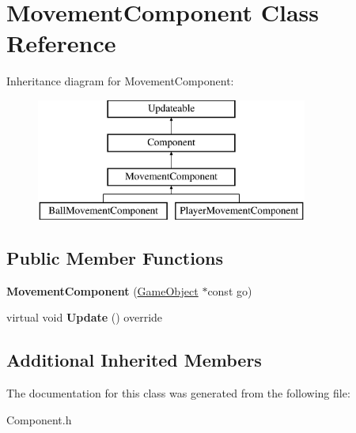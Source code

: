 \hypertarget{class_movement_component}{}\section{Movement\+Component Class Reference}
\label{class_movement_component}
Inheritance diagram for Movement\+Component\+:\begin{figure}[H]
\begin{center}
\leavevmode
\includegraphics[height=4.000000cm]{class_movement_component}
\end{center}
\end{figure}
\subsection*{Public Member Functions}
\begin{DoxyCompactItemize}
\item 
\hypertarget{class_movement_component_a35279737439b7864d5ecb45e05dbfb51}{}{\bfseries Movement\+Component} (\hyperlink{class_game_object}{Game\+Object} $\ast$const go)\label{class_movement_component_a35279737439b7864d5ecb45e05dbfb51}

\item 
\hypertarget{class_movement_component_a6bb340ec8266ff487d600e36e062943f}{}virtual void {\bfseries Update} () override\label{class_movement_component_a6bb340ec8266ff487d600e36e062943f}

\end{DoxyCompactItemize}
\subsection*{Additional Inherited Members}


The documentation for this class was generated from the following file\+:\begin{DoxyCompactItemize}
\item 
Component.\+h\end{DoxyCompactItemize}
